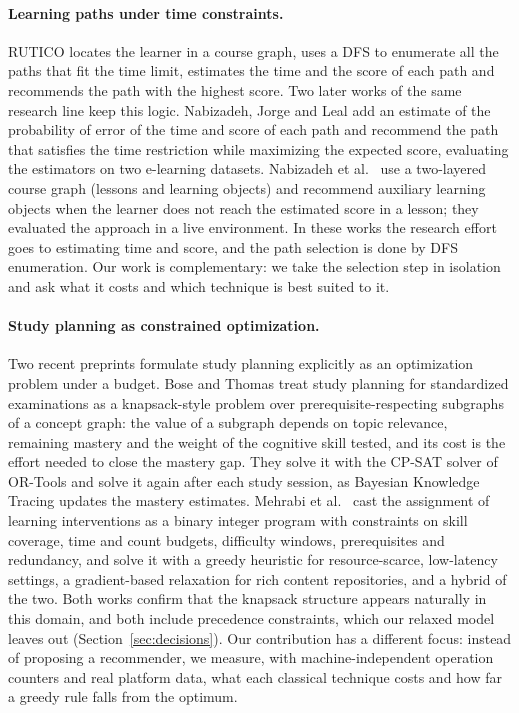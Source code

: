 \paragraph{Learning paths under time constraints.} RUTICO \cite{nabizadeh2017rutico} locates the learner in a course graph, uses a DFS to enumerate all the paths that fit the time limit, estimates the time and the score of each path and recommends the path with the highest score. Two later works of the same research line keep this logic. Nabizadeh, Jorge and Leal \cite{nabizadeh2019uncertainty} add an estimate of the probability of error of the time and score of each path and recommend the path that satisfies the time restriction while maximizing the expected score, evaluating the estimators on two e-learning datasets. Nabizadeh et al.\ \cite{nabizadeh2020auxiliary} use a two-layered course graph (lessons and learning objects) and recommend auxiliary learning objects when the learner does not reach the estimated score in a lesson; they evaluated the approach in a live environment. In these works the research effort goes to estimating time and score, and the path selection is done by DFS enumeration. Our work is complementary: we take the selection step in isolation and ask what it costs and which technique is best suited to it.

\paragraph{Study planning as constrained optimization.} Two recent preprints formulate study planning explicitly as an optimization problem under a budget. Bose and Thomas \cite{bose2026learnopt} treat study planning for standardized examinations as a knapsack-style problem over prerequisite-respecting subgraphs of a concept graph: the value of a subgraph depends on topic relevance, remaining mastery and the weight of the cognitive skill tested, and its cost is the effort needed to close the mastery gap. They solve it with the CP-SAT solver of OR-Tools and solve it again after each study session, as Bayesian Knowledge Tracing updates the mastery estimates. Mehrabi et al.\ \cite{mehrabi2025evidence} cast the assignment of learning interventions as a binary integer program with constraints on skill coverage, time and count budgets, difficulty windows, prerequisites and redundancy, and solve it with a greedy heuristic for resource-scarce, low-latency settings, a gradient-based relaxation for rich content repositories, and a hybrid of the two. Both works confirm that the knapsack structure appears naturally in this domain, and both include precedence constraints, which our relaxed model leaves out (Section~\ref{sec:decisions}). Our contribution has a different focus: instead of proposing a recommender, we measure, with machine-independent operation counters and real platform data, what each classical technique costs and how far a greedy rule falls from the optimum.

